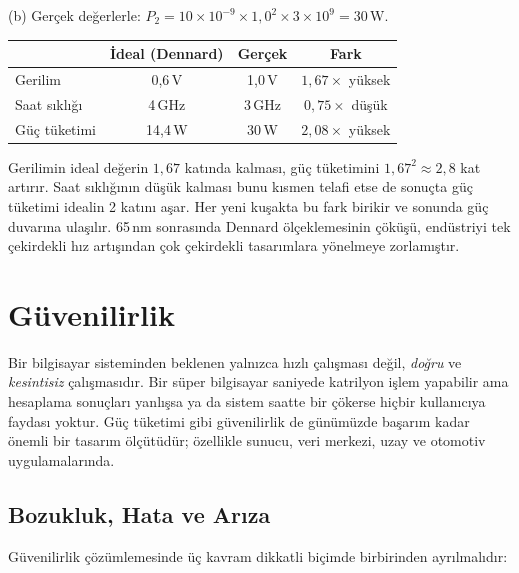 \begin{ornek}[1.6]
(b) Gerçek değerlerle: $P_2 = 10 \times 10^{-9} \times 1{,}0^2 \times 3 \times 10^{9} = 30$\,W.

\begin{center}
\small
\begin{tabular}{lccc}
\toprule
& \textbf{İdeal (Dennard)} & \textbf{Gerçek} & \textbf{Fark} \\
\midrule
Gerilim & 0{,}6\,V & 1{,}0\,V & $1{,}67\times$ yüksek \\
Saat sıklığı & 4\,GHz & 3\,GHz & $0{,}75\times$ düşük \\
Güç tüketimi & 14{,}4\,W & 30\,W & $2{,}08\times$ yüksek \\
\bottomrule
\end{tabular}
\end{center}

Gerilimin ideal değerin $1{,}67$ katında kalması, güç tüketimini $1{,}67^2 \approx 2{,}8$ kat artırır. Saat sıklığının düşük kalması bunu kısmen telafi etse de sonuçta güç tüketimi idealin 2 katını aşar. Her yeni kuşakta bu fark birikir ve sonunda güç duvarına ulaşılır. 65\,nm sonrasında Dennard ölçeklemesinin çöküşü, endüstriyi tek çekirdekli hız artışından çok çekirdekli tasarımlara yönelmeye zorlamıştır.
\end{ornek}

\section{Güvenilirlik}
\label{sec:guvenilirlik}

Bir bilgisayar sisteminden beklenen yalnızca hızlı çalışması değil, \emph{doğru} ve \emph{kesintisiz} çalışmasıdır. Bir süper bilgisayar saniyede katrilyon işlem yapabilir ama hesaplama sonuçları yanlışsa ya da sistem saatte bir çökerse hiçbir kullanıcıya faydası yoktur. Güç tüketimi gibi güvenilirlik de günümüzde başarım kadar önemli bir tasarım ölçütüdür; özellikle sunucu, veri merkezi, uzay ve otomotiv uygulamalarında.

\subsection{Bozukluk, Hata ve Arıza}
\label{subsec:ariza-hata-bozukluk}

Güvenilirlik çözümlemesinde üç kavram dikkatli biçimde birbirinden ayrılmalıdır:

